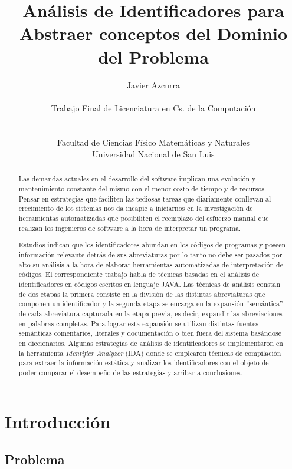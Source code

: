 \documentclass[12pt]{report}
\title{Análisis de Identificadores para Abstraer conceptos del Dominio del Problema}
\author{Javier Azcurra\\\\Trabajo Final de Licenciatura en Cs. de la Computación\\\\\\Facultad de Ciencias Físico Matemáticas y Naturales\\Universidad Nacional de San Luis}
\begin{document}
\maketitle



\begin{abstract}
Las demandas actuales en el desarrollo del software implican una evolución y mantenimiento constante del mismo con el menor costo de tiempo y de recursos. Pensar en estrategias que faciliten las tediosas tareas que diariamente conllevan al crecimiento de los sistemas nos da incapie a iniciarnos en la investigación de herramientas automatizadas que posibiliten el reemplazo del esfuerzo manual que realizan los ingenieros de software a la hora de interpretar un programa.

Estudios indican que los identificadores abundan en los códigos de programas y poseen información relevante detrás de sus abreviaturas por lo tanto no debe ser pasados por alto su análisis a la hora de elaborar herramientas automatizadas de interpretación de códigos.
El correspondiente trabajo habla de técnicas basadas en el análisis de identificadores en códigos escritos en lenguaje JAVA\texttrademark .
Las técnicas de análisis constan de dos etapas la primera consiste en la división de las distintas abreviaturas que componen un identificador y la segunda etapa se encarga en la expansión “semántica” de cada abreviatura capturada en la etapa previa, es decir, expandir las abreviaciones en palabras completas. Para lograr esta expansión se utilizan distintas fuentes semánticas comentarios, literales y documentación o bien fuera del sistema basándose en diccionarios. Algunas estrategias de análisis de identificadores se implementaron en la herramienta \textit{Identifier Analyzer} (IDA) donde se emplearon técnicas de compilación para extraer la información estática y analizar los identificadores con el objeto de poder comparar el desempeño de las estrategias y arribar a conclusiones.


\end{abstract}

\chapter{Introducción}
\section{Problema}
\end{document}
